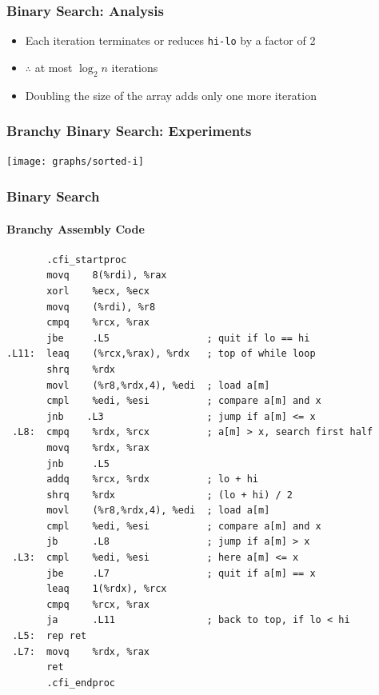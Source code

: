 \documentclass[xcolor=dvipsnames]{beamer}
\begin{document}
\begin{frame}[fragile]
  \frametitle{Binary Search: Analysis}

  \begin{itemize}
    \item Each iteration terminates or 
      reduces \texttt{hi-lo} by a factor of 2
    \item $\therefore$ at most $\log_2 n$ iterations
    \item Doubling the size of the array adds only one more iteration
  \end{itemize}
\end{frame}

\begin{frame}
  \frametitle{Branchy Binary Search: Experiments}
  \begin{center}
    \texttt{[image: graphs/sorted-i]}
  \end{center}
\end{frame}

\begin{frame}[fragile]
  \frametitle{Binary Search}
  \framesubtitle{Branchy Assembly Code}

\tiny
\begin{verbatim}
       .cfi_startproc
       movq    8(%rdi), %rax
       xorl    %ecx, %ecx
       movq    (%rdi), %r8
       cmpq    %rcx, %rax
       jbe     .L5                 ; quit if lo == hi
.L11:  leaq    (%rcx,%rax), %rdx   ; top of while loop
       shrq    %rdx
       movl    (%r8,%rdx,4), %edi  ; load a[m]
       cmpl    %edi, %esi          ; compare a[m] and x
       jnb    .L3                  ; jump if a[m] <= x
 .L8:  cmpq    %rdx, %rcx          ; a[m] > x, search first half
       movq    %rdx, %rax
       jnb     .L5
       addq    %rcx, %rdx          ; lo + hi
       shrq    %rdx                ; (lo + hi) / 2
       movl    (%r8,%rdx,4), %edi  ; load a[m]
       cmpl    %edi, %esi          ; compare a[m] and x
       jb      .L8                 ; jump if a[m] > x
 .L3:  cmpl    %edi, %esi          ; here a[m] <= x
       jbe     .L7                 ; quit if a[m] == x
       leaq    1(%rdx), %rcx
       cmpq    %rcx, %rax
       ja      .L11                ; back to top, if lo < hi
 .L5:  rep ret
 .L7:  movq    %rdx, %rax
       ret
       .cfi_endproc
\end{verbatim}

\end{frame}
\end{document}
